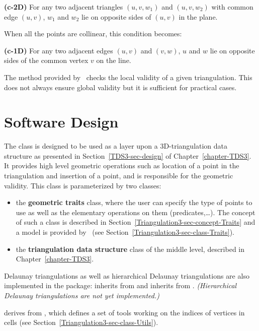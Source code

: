 {\bf (c-2D)} For any two adjacent triangles $(u,v,w_1)$ and $(u,v,w_2)$ with
common edge $(u,v)$, $w_1$ and $w_2$ lie on opposite sides of $(u,v)$
in the plane.

When all the points are collinear, this condition becomes:

{\bf (c-1D)} For any two adjacent edges $(u,v)$ and $(v,w)$, $u$ and
$w$ lie on opposite sides of the common vertex $v$ on the line.

The  method provided by \cgal\ checks the local
validity of a given triangulation. This does not always
ensure global validity \cite{mnssssu-cgpvg-96,dlpt-ccpps-98} but it is 
sufficient for practical cases.

\section{Software Design}
\label{Triangulation3-sec-design}

The class  is designed to be used as 
a layer upon a 3D-triangulation data structure as presented in 
Section~\ref{TDS3-sec-design} of Chapter~\ref{chapter-TDS3}.
It provides high level geometric operations such as location of a point
in the triangulation and insertion of a point, and is responsible for
the geometric validity. This class is parameterized by two classes:
\begin{itemize}
\item {} the \textbf{geometric traits} class, where the user can
specify the type of points to use as well as the elementary
operations on them (predicates,\ldots). The concept of such a class is
described in Section~\ref{Triangulation3-sec-concept-Traits} and a
model is provided by \cgal\ (see
Section~\ref{Triangulation3-sec-class-Traits}).
\item {} the \textbf{triangulation data structure} class of the middle level, 
described in Chapter~\ref{chapter-TDS3}.
\end{itemize}	

Delaunay triangulations as well as hierarchical Delaunay triangulations
\cite{d-iirdt-98} are also implemented in the package: 
 inherits from 
 and 
 inherits from 
. \textit{(Hierarchical
Delaunay triangulations are not yet implemented.)} 

 derives from
, which defines a set of tools
working on the indices of vertices in cells (see
Section~\ref{Triangulation3-sec-class-Utils}). 

